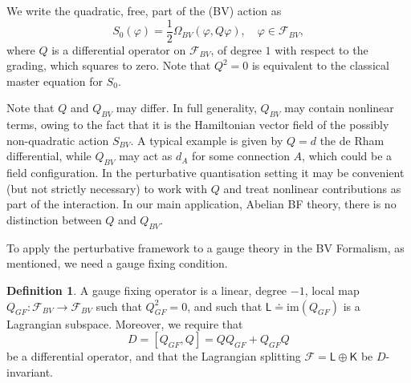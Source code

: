 \documentclass[reqno]{amsart}
\theoremstyle{definition}
\newtheorem{defn}[thm]{Definition}
\theoremstyle{remark}
\renewcommand{\phi}{\varphi}
\newcommand{\F}{\mathcal{F}}
\newcommand{\sfK}{\mathsf{K}}
\newcommand{\sfL}{\mathsf{L}}
\begin{document}
We write the quadratic, free, part of the (BV) action as 
$$S_0(\phi) = \frac{1}{2}\Omega_{BV}(\phi,Q\phi), \quad \phi\in\F_{BV},$$
where $Q$ is a differential operator on $\F_{BV}$, of degree $1$ with respect to the grading, which squares to zero. Note that $Q^2 = 0$ is equivalent to the classical master equation for $S_0$. 
\begin{rmk}[$Q$ vs. $Q_{BV}$]\label{rmk:QvsQBV}
    Note that $Q$ and $Q_{BV}$ may differ. In full generality, $Q_{BV}$ may contain nonlinear terms, owing to the fact that it is the Hamiltonian vector field of the possibly non-quadratic action $S_{BV}$. A typical example is given by $Q=d$ the de Rham differential, while $Q_{BV}$ may act as $d_A$ for some connection $A$, which could be a field configuration. In the perturbative quantisation setting it may be convenient (but not strictly necessary) to work with $Q$ and treat nonlinear contributions as part of the interaction. In our main application, Abelian BF theory, there is no distinction between $Q$ and $Q_{BV}$.
\end{rmk}

To apply the perturbative framework to a gauge theory in the BV Formalism, as mentioned, we need a gauge fixing condition. 

\begin{defn}\label{def:GFoperator}
A gauge fixing operator is a linear, degree $-1$, local map $Q_{GF}\colon \F_{BV} \to \F_{BV}$ such that $Q_{GF}^2=0$,  and such that $\sfL\doteq \mathrm{im}(Q_{GF})$ is a Lagrangian subspace. Moreover, we require that  
    \[
    D=[Q_{GF},Q]= QQ_{GF} + Q_{GF}Q
    \] 
be a differential operator, and that the Lagrangian splitting $\F=\sfL \oplus \sfK$ be $D$-invariant.
\end{defn}
\end{document}
